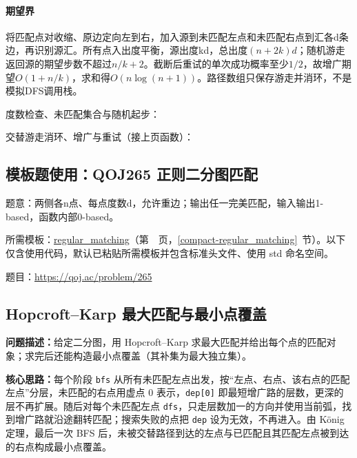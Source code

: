 \paragraph{期望界} 将匹配点对收缩、原边定向左到右，加入源到未匹配左点和未匹配右点到汇各d条边，再识别源汇。所有点入出度平衡，源出度kd，总出度$(n+2k)d$；随机游走返回源的期望步数不超过$n/k+2$。截断后重试的单次成功概率至少$1/2$，故增广期望$O(1+n/k)$，求和得$O(n\log(n+1))$。路径数组只保存游走并消环，不是模拟DFS调用栈。

\newpage\noindent 度数检查、未匹配集合与随机起步：



\newpage\noindent 交替游走消环、增广与重试（接上页函数）：



\Needspace{355pt}

\subsection*{模板题使用：QOJ265 正则二分图匹配}

\label{usage-example-389}

题意：两侧各n点、每点度数d，允许重边；输出任一完美匹配，输入输出1-based，函数内部0-based。

所需模板：\hyperref[compact-regular_matching]{regular\_\allowbreak{}matching}（第~\pageref{compact-regular_matching}~页，\ref{compact-regular_matching}~节）。以下仅含使用代码，默认已粘贴所需模板并包含标准头文件、使用 std 命名空间。

题目：\url{https://qoj.ac/problem/265}



\subsection{Hopcroft--Karp 最大匹配与最小点覆盖}\label{compact-BipartiteMatching}

\noindent\textbf{问题描述：}\allowbreak 给定二分图，用 Hopcroft–Karp 求最大匹配并给出每个点的匹配对象；求完后还能构造最小点覆盖（其补集为最大独立集）。

\textbf{核心思路：}\allowbreak 每个阶段 \texttt{bfs} 从所有未匹配左点出发，按“左点、右点、该右点的匹配左点”分层，未匹配的右点用虚点 0 表示，\texttt{dep[0]} 即最短增广路的层数，更深的层不再扩展。随后对每个未匹配左点 \texttt{dfs}，只走层数加一的方向并使用当前弧，找到增广路就沿途翻转匹配；搜索失败的点把 \texttt{dep} 设为无效，不再进入。由 König 定理，最后一次 BFS 后，未被交替路径到达的左点与已匹配且其匹配左点被到达的右点构成最小点覆盖。



